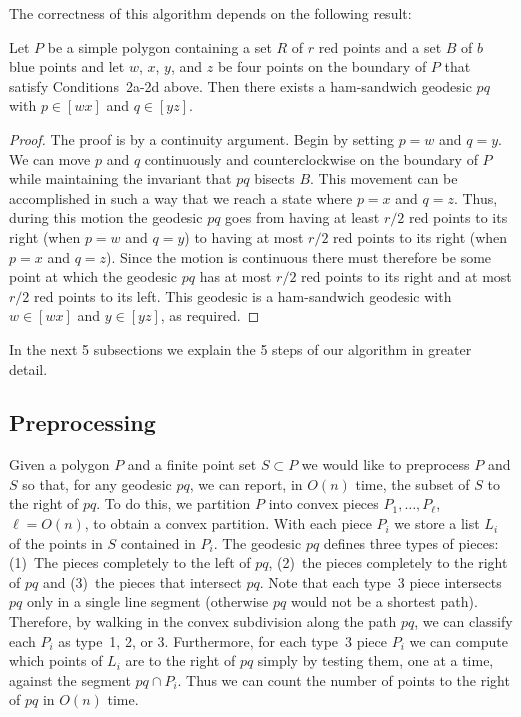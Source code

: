 \documentclass[charterfonts,lotsofwhite]{patmorin}
\newcommand{\chain}[2]{[#1#2]}
\begin{document}
The correctness of this algorithm depends on the following result:

\begin{lem}
Let $P$ be a simple polygon containing a set $R$ of $r$ red points and
a set $B$ of $b$ blue
points and let $w$, $x$, $y$, and $z$ be four points on the boundary
of $P$ that satisfy Conditions~2a-2d above.  Then there exists a
ham-sandwich geodesic $pq$ with $p\in\chain{w}{x}$ and $q\in\chain{y}{z}$.
\end{lem}

\begin{proof}
The proof is by a continuity argument.  Begin by setting $p=w$ and
$q=y$.  We can move $p$ and $q$ continuously and counterclockwise on
the boundary of $P$ while maintaining the invariant that $pq$ bisects
$B$.  This movement can be accomplished in such a way that we
reach a state where $p=x$ and $q=z$.  Thus, during this motion the
geodesic $pq$ goes from having at least $r/2$ red points to its right
(when $p=w$ and $q=y$) to having at most $r/2$ red points to its right 
(when $p=x$ and $q=z$).  Since the motion is continuous there must
therefore be some point at which the geodesic $pq$ has at most $r/2$
red points to its right and at most $r/2$ red points to its left.
This geodesic is a ham-sandwich geodesic with $w\in\chain{w}{x}$ and
$y\in\chain{y}{z}$, as required.
\end{proof}

In the next 5 subsections we explain the 5 steps of our algorithm in
greater detail.

\subsection{Preprocessing}

Given a polygon $P$ and a finite point set $S\subset P$ we would like
to preprocess $P$ and $S$ so that, for any geodesic $pq$, we can
report, in $O(n)$ time, the subset of $S$ to the right of $pq$.  To do
this, we partition $P$ into convex pieces $P_1,\ldots,P_\ell$,
$\ell=O(n)$, to obtain a convex partition.  With each piece $P_i$ we
store a list $L_i$ of the points in $S$ contained in $P_i$.  The
geodesic $pq$ defines three types of pieces: (1)~The pieces completely
to the left of $pq$, (2)~the pieces completely to the right of $pq$
and (3)~the pieces that intersect $pq$.  Note that each type~3 piece
intersects $pq$ only in a single line segment (otherwise $pq$ would
not be a shortest path).  Therefore, by walking in the convex
subdivision along the path $pq$, we can classify each $P_i$ as type~1,
2, or 3.  Furthermore, for each type~3 piece $P_i$ we can compute
which points of $L_i$ are to the right of $pq$ simply by testing them,
one at a time, against the segment $pq\cap P_i$.  Thus we can count
the number of points to the right of $pq$ in $O(n)$ time.
\end{document}
